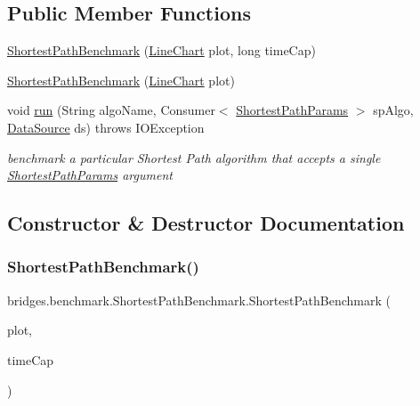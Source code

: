\subsection*{Public Member Functions}
\begin{DoxyCompactItemize}
\item 
\hyperlink{classbridges_1_1benchmark_1_1_shortest_path_benchmark_ad878c2ad9c6912170601092423c54c43}{Shortest\+Path\+Benchmark} (\hyperlink{classbridges_1_1base_1_1_line_chart}{Line\+Chart} plot, long time\+Cap)
\item 
\hyperlink{classbridges_1_1benchmark_1_1_shortest_path_benchmark_ac84a2afc6e663b9d4edc61b3d4c4701c}{Shortest\+Path\+Benchmark} (\hyperlink{classbridges_1_1base_1_1_line_chart}{Line\+Chart} plot)
\item 
void \hyperlink{classbridges_1_1benchmark_1_1_shortest_path_benchmark_a0cce4cdac54c71c6dfc6d4a8f29df176}{run} (String algo\+Name, Consumer$<$ \hyperlink{classbridges_1_1benchmark_1_1_shortest_path_params}{Shortest\+Path\+Params} $>$ sp\+Algo, \hyperlink{classbridges_1_1connect_1_1_data_source}{Data\+Source} ds)  throws I\+O\+Exception 
\begin{DoxyCompactList}\small\item\em benchmark a particular Shortest Path algorithm that accepts a single \hyperlink{classbridges_1_1benchmark_1_1_shortest_path_params}{Shortest\+Path\+Params} argument \end{DoxyCompactList}\end{DoxyCompactItemize}


\subsection{Constructor \& Destructor Documentation}
\mbox{\label{classbridges_1_1benchmark_1_1_shortest_path_benchmark_ad878c2ad9c6912170601092423c54c43}} 
\subsubsection{\texorpdfstring{Shortest\+Path\+Benchmark()}{ShortestPathBenchmark()}\hspace{0.1cm}{\footnotesize\ttfamily [1/2]}}
{\footnotesize\ttfamily bridges.\+benchmark.\+Shortest\+Path\+Benchmark.\+Shortest\+Path\+Benchmark (\begin{DoxyParamCaption}\item[{\hyperlink{classbridges_1_1base_1_1_line_chart}{Line\+Chart}}]{plot,  }\item[{long}]{time\+Cap }\end{DoxyParamCaption})}

